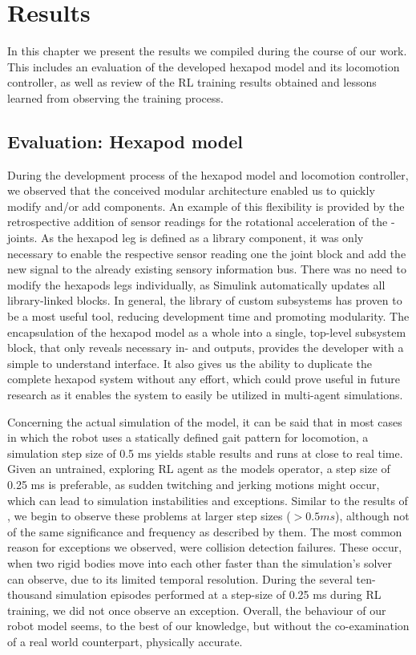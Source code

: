 \chapter{Results}
\label{ch:results}

In this chapter we present the results we compiled during the course of our work.
This includes an evaluation of the developed hexapod model and its locomotion controller, as well as review of the RL training results obtained and lessons learned from observing the training process.

\section{Evaluation: Hexapod model}
During the development process of the hexapod model and locomotion controller, we observed that the conceived modular architecture enabled us to quickly modify and/or add components.
An example of this flexibility is provided by the retrospective addition of sensor readings for the rotational acceleration of the \textalpha-joints.
As the hexapod leg is defined as a library component, it was only necessary to enable the respective sensor reading one the joint block and add the new signal to the already existing sensory information bus. 
There was no need to modify the hexapods legs individually, as Simulink automatically updates all library-linked blocks.
In general, the library of custom subsystems has proven to be a most useful tool, reducing development time and promoting modularity.
The encapsulation of the hexapod model as a whole into a single, top-level subsystem block, that only reveals necessary in- and outputs, provides the developer with a simple to understand interface.
It also gives us the ability to duplicate the complete hexapod system without any effort, which could prove useful in future research as it enables the system to easily be utilized in multi-agent simulations.

Concerning the actual simulation of the model, it can be said that in most cases in which the robot uses a statically defined gait pattern for locomotion, a simulation step size of 0.5 ms yields stable results and runs at close to real time.
Given an untrained, exploring RL agent as the models operator, a step size of 0.25 ms is preferable, as sudden twitching and jerking motions might occur, which can lead to simulation instabilities and exceptions.
Similar to the results of \cite{thilderkvist2015motion}, we begin to observe these problems at larger step sizes ($> 0.5 ms$), although not of the same significance and frequency as described by them. 
The most common reason for exceptions we observed, were collision detection failures.
These occur, when two rigid bodies move into each other faster than the simulation's solver can observe, due to its limited temporal resolution.
During the several ten-thousand simulation episodes performed at a step-size of 0.25 ms during RL training, we did not once observe an exception.
Overall, the behaviour of our robot model seems, to the best of our knowledge, but without the co-examination of a real world counterpart, physically accurate.


